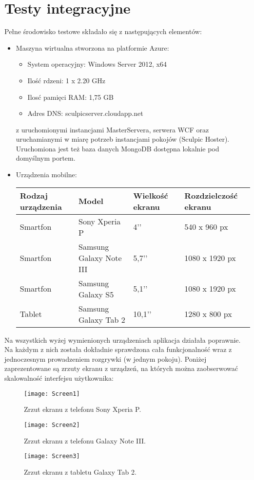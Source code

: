 \section{Testy integracyjne}
Pełne środowisko testowe składało się z następujących elementów:
\begin{itemize}
    \item Maszyna wirtualna stworzona na platformie Azure:
    \begin{itemize}
    \item System operacyjny: Windows Server 2012, x64
    \item Ilość rdzeni: 1 x 2.20 GHz
    \item Ilosć pamięci RAM: 1,75 GB
    \item Adres DNS: sculpicserver.cloudapp.net
    \end{itemize}
    z uruchomionymi instancjami MasterServera, serwera WCF oraz uruchamianymi w miarę potrzeb instancjami pokojów (Sculpic Hoster). Uruchomiona jest też baza danych MongoDB dostępna lokalnie pod domyślnym portem.
    \item Urządzenia mobilne:
    \begin{center}
    \begin{tabular}{|m{2cm}|m{3cm}|m{2cm}|m{3cm}|}
    \hline
    Rodzaj urządzenia & Model & Wielkość ekranu & Rozdzielczość ekranu \\ \hline \hline
    Smartfon & Sony Xperia P & 4’’ & 540 x 960 px \\ \hline
    Smartfon & Samsung Galaxy Note III & 5,7’’ & 1080 x 1920 px \\ \hline
    Smartfon & Samsung Galaxy S5 & 5,1’’ & 1080 x 1920 px \\ \hline
    Tablet & Samsung Galaxy Tab 2 & 10,1’’ & 1280 x 800 px \\ \hline
    \end{tabular}
    \end{center}
\end{itemize}

Na wszystkich wyżej wymienionych urządzeniach aplikacja działała poprawnie. Na każdym z nich została dokładnie sprawdzona cała funkcjonalność wraz z jednoczesnym prowadzeniem rozgrywki (w jednym pokoju). Poniżej zaprezentowane są zrzuty ekranu z urządzeń, na których można zaobserwować skalowalność interfejsu użytkownika:

\begin{figure}[htbp]
\centering
\texttt{[image: Screen1]}
\caption{Zrzut ekranu z telefonu Sony Xperia P.}
\label{fig:screen1}
\end{figure}

\begin{figure}[htbp]
\centering
\texttt{[image: Screen2]}
\caption{Zrzut ekranu z telefonu Galaxy Note III.}
\label{fig:screen2}
\end{figure}

\begin{figure}[htbp]
\centering
\texttt{[image: Screen3]}
\caption{Zrzut ekranu z tabletu Galaxy Tab 2.}
\label{fig:screen3}
\end{figure}